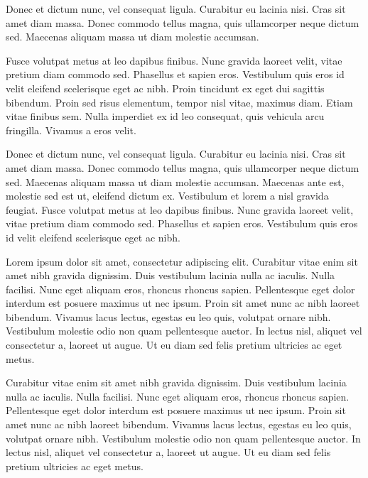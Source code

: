\begin{definition}
Donec et dictum nunc, vel consequat ligula. Curabitur eu lacinia nisi. Cras sit amet diam massa. Donec commodo tellus magna, quis ullamcorper neque dictum sed. Maecenas aliquam massa ut diam molestie accumsan. 
\end{definition}

\begin{definition}
Fusce volutpat metus at leo dapibus finibus. Nunc gravida laoreet velit, vitae pretium diam commodo sed. Phasellus et sapien eros. Vestibulum quis eros id velit eleifend scelerisque eget ac nibh. Proin tincidunt ex eget dui sagittis bibendum. Proin sed risus elementum, tempor nisl vitae, maximus diam. Etiam vitae finibus sem. Nulla imperdiet ex id leo consequat, quis vehicula arcu fringilla. Vivamus a eros velit.
\end{definition}

\begin{definition}[Vestibulum]
Donec et dictum nunc, vel consequat ligula. Curabitur eu lacinia nisi. Cras sit amet diam massa. Donec commodo tellus magna, quis ullamcorper neque dictum sed. Maecenas aliquam massa ut diam molestie accumsan. Maecenas ante est, molestie sed est ut, eleifend dictum ex. Vestibulum et lorem a nisl gravida feugiat. Fusce volutpat metus at leo dapibus finibus. Nunc gravida laoreet velit, vitae pretium diam commodo sed. Phasellus et sapien eros. Vestibulum quis eros id velit eleifend scelerisque eget ac nibh.	
\end{definition}

Lorem ipsum dolor sit amet, consectetur  adipiscing elit. Curabitur vitae enim sit amet nibh gravida dignissim. Duis vestibulum lacinia nulla ac iaculis. Nulla facilisi. Nunc eget aliquam eros, rhoncus rhoncus sapien. Pellentesque eget dolor interdum est posuere maximus ut nec ipsum. Proin sit amet nunc ac nibh laoreet bibendum. Vivamus lacus lectus, egestas eu leo quis, volutpat ornare nibh. Vestibulum molestie odio non quam pellentesque auctor. In lectus nisl, aliquet vel consectetur a, laoreet ut augue. Ut eu diam sed felis pretium ultricies ac eget metus.

Curabitur vitae enim sit amet nibh gravida dignissim. Duis vestibulum lacinia nulla ac iaculis. Nulla facilisi. Nunc eget aliquam eros, rhoncus rhoncus sapien. Pellentesque eget dolor interdum est posuere maximus ut nec ipsum. Proin sit amet nunc ac nibh laoreet bibendum. Vivamus lacus lectus, egestas eu leo quis, volutpat ornare nibh. Vestibulum molestie odio non quam pellentesque auctor. In lectus nisl, aliquet vel consectetur a, laoreet ut augue. Ut eu diam sed felis pretium ultricies ac eget metus.

